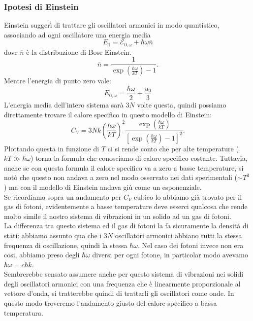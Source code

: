 \subsubsection{Ipotesi di Einstein}%
\label{subsub:Ipotesi di Einstein}
Einstein suggerì di trattare gli oscillatori armonici in modo quantistico, associando ad ogni oscillatore una energia media 
\[
	E_1=\mathcal{E} _{0,\omega } + \hbar\omega \overline{n}
\]
dove $\overline{n}$ è la distribuzione di Bose-Einstein.
\[
	\overline{n} = \frac{1}{\exp\left( \frac{\hbar \omega }{kT} \right) -1}
.\] 
Mentre l'energia di punto zero vale: 
\[
	E_{0, \omega } = \frac{\hbar \omega }{2} + \frac{u_0}{3}
\]
L'energia media dell'intero sistema sarà $3N$ volte questa, quindi possiamo direttamente trovare il calore specifico in questo modello di Einstein:
\[
	C_{V} = 3Nk\left( \frac{\hbar\omega }{kT} \right) ^2 
	\frac{\exp\left( \frac{\hbar\omega }{kT} \right) }{\left[ \exp\left( \frac{\hbar\omega }{kT} \right) -1 \right] ^2}
.\] 
Plottando questa in funzione di $T$ ci si rende conto che per alte temperature ($kT \gg \hbar \omega $) torna la formula che conosciamo di calore specifico costante. 
Tuttavia, anche se con questa formula il calore specifico va a zero a basse temperature, si notò che questo non andava a zero nel modo osservato nei dati sperimentali ($\sim T^{3}$) ma con il modello di Einstein andava giù come un esponenziale.\\
Se ricordiamo sopra un andamento per $C_{V}$ cubico lo abbiamo già trovato per il gas di fotoni, evidentemente a basse temperature deve esserci qualcosa che rende molto simile il nostro sistema di vibrazioni in un solido ad un gas di fotoni.\\
La differenza tra questo sistema ed il gas di fotoni la fa sicuramente la densità di stati: abbiamo assunto qua che i $3N$ oscillatori armonici abbiano tutti la stessa frequenza di oscillazione, quindi la stessa $\hbar\omega $. Nel caso dei fotoni invece non era cosi, abbiamo preso degli $\hbar\omega $ diversi per ogni fotone, in particolar modo avevamo  $\hbar\omega = c \hbar k$.\\
Sembrerebbe sensato assumere anche per questo sistema di vibrazioni nei solidi degli oscillatori armonici con una frequenza che è linearmente proporzionale al vettore d'onda, si tratterebbe quindi di trattarli gli oscillatori come onde. In questo modo troveremo l'andamento giusto del calore specifico a bassa temperatura.
